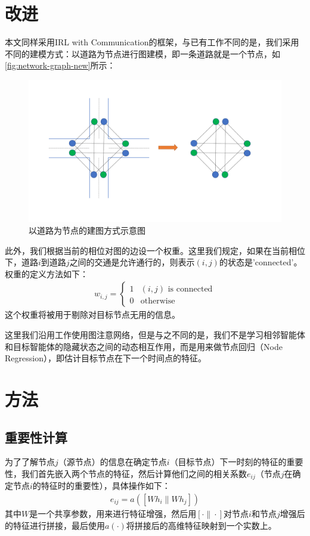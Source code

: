 \section{改进}
本文同样采用IRL with Communication的框架，与已有工作不同的是，我们采用不同的建模方式：以道路为节点进行图建模，即一条道路就是一个节点，如\autoref{fig:network-graph-new}所示：
\begin{figure}[htb]
  \includegraphics[width=1.2\textwidth]{ppt/graph-modeling.pdf}
  \caption{以道路为节点的建图方式示意图}
  \label{fig:network-graph-new}
\end{figure}

此外，我们根据当前的相位对图的边设一个权重。这里我们规定，如果在当前相位下，道路$i$到道路$j$之间的交通是允许通行的，则表示$(i,j)$的状态是'connected'。权重的定义方法如下：
\begin{align}
  w_{i,j} = \begin{cases}
    1 & (i, j) \text{ is connected} \\
    0 & \text{otherwise}
  \end{cases}
\end{align}
这个权重将被用于剔除对目标节点无用的信息。

这里我们沿用工作使用图注意网络，但是与之不同的是，我们不是学习相邻智能体和目标智能体的隐藏状态之间的动态相互作用，而是用来做节点回归（Node Regression），即估计目标节点在下一个时间点的特征。
\section{方法}
\subsection{重要性计算}
为了了解节点$j$（源节点）的信息在确定节点$i$（目标节点）下一时刻的特征的重要性，我们首先嵌入两个节点的特征，然后计算他们之间的相关系数$e_{i j}$（节点$j$在确定节点$i$的特征时的重要性），具体操作如下：
\begin{align}
  e_{i j}=a\left(\left[W h_{i} \| W h_{j}\right]\right)
\end{align}
其中$W$是一个共享参数，用来进行特征增强，然后用$[\cdot \| \cdot]$对节点$i$和节点$j$增强后的特征进行拼接，最后使用$a(\cdot)$将拼接后的高维特征映射到一个实数上。
